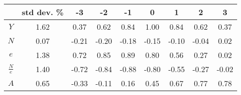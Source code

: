 \begin{tabular}{ccccccccc}
\toprule
 & std dev. \% & -3 & -2 & -1 & 0 & 1 & 2 & 3 \\
\midrule
$Y$ & 1.62 & 0.37 & 0.62 & 0.84 & 1.00 & 0.84 & 0.62 & 0.37 \\
$N$ & 0.07 & -0.21 & -0.20 & -0.18 & -0.15 & -0.10 & -0.04 & 0.02 \\
$e$ & 1.38 & 0.72 & 0.85 & 0.89 & 0.80 & 0.56 & 0.27 & 0.02 \\
$\frac{N}{e}$ & 1.40 & -0.72 & -0.84 & -0.88 & -0.80 & -0.55 & -0.27 & -0.02 \\
$A$ & 0.65 & -0.33 & -0.11 & 0.16 & 0.45 & 0.67 & 0.77 & 0.78 \\
\bottomrule
\end{tabular}
